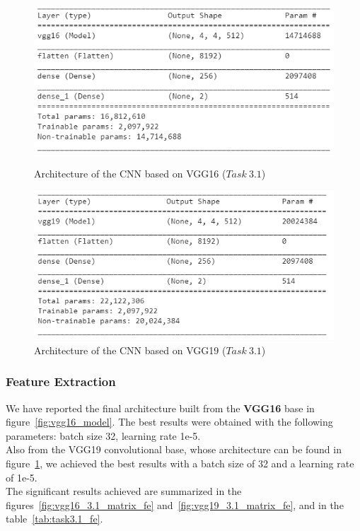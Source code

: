 \documentclass[11pt,a4paper,oneside]{article}
\begin{document}
\begin{figure}[h]
\centering
	\begin{minipage}[c]{.45\textwidth}
		\includegraphics[width=.9\textwidth]{images/Task 3/VGG16 3.1/Model}
		\caption{Architecture of the CNN based on VGG16 ($Task\ 3.1$)}
		\label{fig:vgg16_model}
	\end{minipage}	
	\hspace{5mm}%
	\begin{minipage}[c]{.45\textwidth}
		\centering\setlength{\captionmargin}{0pt}%
		\includegraphics[width=.9\textwidth]{images/Task 3/VGG19 3.1/Model}
		\caption{Architecture of the CNN based on VGG19 ($Task\ 3.1$)}
		\label{fig:vgg19_model}
	\end{minipage}
\end{figure}

\subsubsection{Feature Extraction}
We have reported the final architecture built from the \textbf{VGG16} base in figure~\ref{fig:vgg16_model}. 
The best results were obtained with the following parameters: batch size 32, learning rate 1e-5. \\
Also from the VGG19 convolutional base, whose architecture can be found in figure~\ref{fig:vgg19_model}, we achieved the best results with a batch size of 32 and a learning rate of 1e-5. \\
The significant results achieved are summarized in the figures~\ref{fig:vgg16_3.1_matrix_fe} and~\ref{fig:vgg19_3.1_matrix_fe}, and in the table~\ref{tab:task3.1_fe}.
\end{document}
